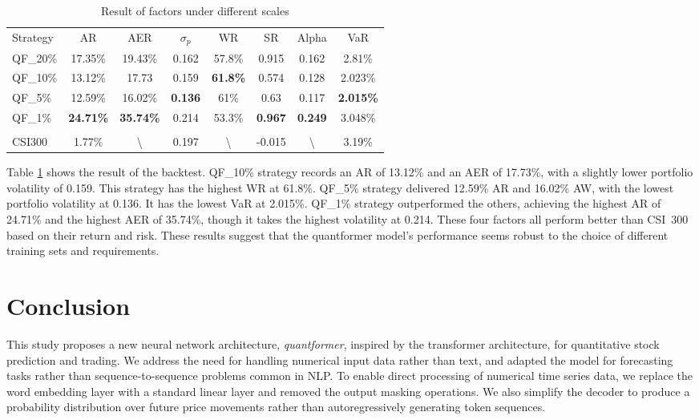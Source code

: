 \documentclass[preprint,12pt]{elsarticle}
\begin{document}
\begin{table}[ht]
\caption{Result of factors under different scales}
\centering
\label{scale}
{
\renewcommand{\arraystretch}{0.5}\textbf{}
\begin{tabular}{l c c c c c c c}
\toprule
Strategy & AR & AER & $\sigma_p$ & WR & SR & Alpha & VaR\\ [0.5ex] 
QF\_20\% & 17.35\% & 19.43\% & 0.162 & 57.8\% & 0.915 & 0.162 & 2.81\%\\ [0.5ex] 
QF\_10\% & 13.12\% & 17.73 & 0.159 & \textbf{61.8\%} & 0.574 & 0.128 & 2.023\%  \\ [0.5ex] 
QF\_5\% & 12.59\% & 16.02\%  & \textbf{0.136} & 61\% & 0.63 & 0.117 & \textbf{2.015\%} \\ [0.5ex]
QF\_1\% & \textbf{24.71\%} & \textbf{35.74\%} & 0.214 & 53.3\% & \textbf{0.967} & \textbf{0.249} & 3.048\% \\ [0.5ex]
\hline \\
CSI300 & 1.77\% & \textbackslash & 0.197 & \textbackslash & -0.015 & \textbackslash & 3.19\% \\ [0.5ex] 
\bottomrule
\end{tabular}
}
\end{table}

Table \ref{scale} shows the result of the backtest. QF\_10\% strategy records an AR of 13.12\% and an AER of 17.73\%, with a slightly lower portfolio volatility of 0.159. This strategy has the highest WR at 61.8\%. QF\_5\% strategy delivered 12.59\% AR and 16.02\% AW, with the lowest portfolio volatility at 0.136. It has the lowest VaR at 2.015\%. QF\_1\% strategy outperformed the others, achieving the highest AR of 24.71\% and the highest AER of 35.74\%, though it takes the highest volatility at 0.214. These four factors all perform better than CSI~300 based on their return and risk. These results suggest that the quantformer model's performance seems robust to the choice of different training sets and requirements. 

\section{Conclusion}
This study proposes a new neural network architecture, \emph{quantformer}, inspired by the transformer architecture, for quantitative stock prediction and trading. We address the need for handling numerical input data rather than text, and adapted the model for forecasting tasks rather than sequence-to-sequence problems common in NLP. To enable direct processing of numerical time series data, we replace the word embedding layer with a standard linear layer and removed the output masking operations. We also simplify the decoder to produce a probability distribution over future price movements rather than autoregressively generating token sequences.
\end{document}
